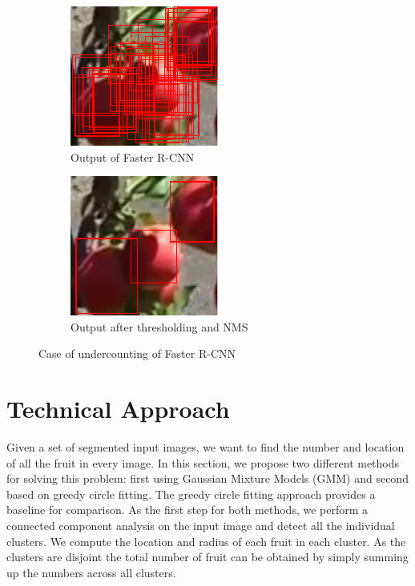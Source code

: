  
\begin{figure}[b]
    \centering
    \begin{subfigure}[b]{.45\textwidth}
    \centering
    \includegraphics[width=0.45\columnwidth]{figures/counting/detectionProblem1}
    \caption{Output of Faster R-CNN}\label{fig:main2a}%
    \end{subfigure}    \quad\begin{subfigure}[b]{.45\textwidth}
    \centering
    \includegraphics[width=0.45\columnwidth]{figures/counting/detectionProblem2.pdf}
    \caption{Output after thresholding and NMS }\label{fig:main2b}%
    \end{subfigure}
    \caption[Counting with Faster R-CNN]{Case of undercounting of Faster R-CNN}
    \label{fig:failureRCNN}
\end{figure}


\section{Technical Approach}\label{sec:technical}
Given a set of segmented input images, we want to find the number and location of all the fruit in every image. In this section, we propose two different methods for solving this problem: first using Gaussian Mixture Models (GMM) and second based on greedy circle fitting. The greedy circle fitting approach provides a baseline for comparison. As the first step for both methods, we perform a connected component analysis on the input image and detect all the individual clusters. We compute the location and radius of each fruit in each cluster. As the clusters are disjoint the total number of fruit can be obtained by simply summing up the numbers across all clusters.



